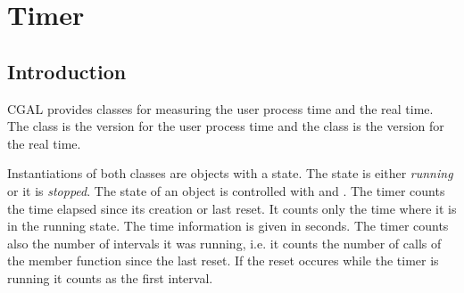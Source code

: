 
\ccParDims

\chapter{Timer}
\label{chapterTimer}

\section{Introduction}

CGAL provides classes for measuring the user process time and the real time.
The class  is the version for the user process time and
the class  is the version for the real time.

Instantiations of both classes are objects with a state. The state is
either {\em running\/} or it is {\em stopped}. The state of an object
 is controlled
with  and  . The timer counts the
time elapsed since its creation or last reset. It counts only the time
where it is in the running state. The time information is given in seconds.
The timer counts also the number of intervals it was running, i.e. it 
counts the number of calls of the  member function since the 
last reset. If the reset occures while the timer is running it counts as the
first interval.


\ccParDims

